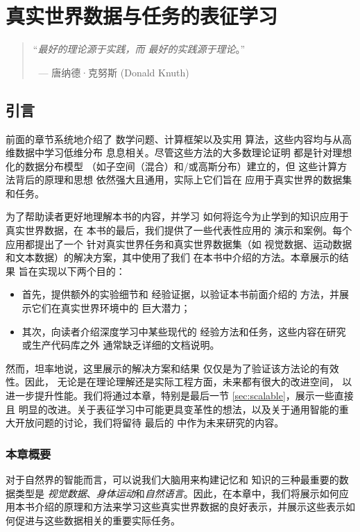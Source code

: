 \documentclass[../../book-main_zh.tex]{subfiles}
\begin{document}
\chapter{真实世界数据与任务的表征学习}
\label{ch:applications}

\begin{quote}
    \hfill    ``{\em 最好的理论源于实践，而
    最好的实践源于理论}。''

    $~$ \hfill --- 唐纳德·克努斯 (Donald Knuth)
\end{quote}
\vspace{5mm}

\section{引言}
前面的章节系统地介绍了
数学问题、计算框架以及实用
算法，这些内容均与从高维数据中学习低维分布
息息相关。尽管这些方法的大多数理论证明
都是针对理想化的数据分布模型
（如子空间（混合）和/或高斯分布）建立的，但
这些计算方法背后的原理和思想
依然强大且通用，实际上它们旨在
应用于真实世界的数据集和任务。

为了帮助读者更好地理解本书的内容，并学习
如何将迄今为止学到的知识应用于真实世界数据，在
本书的最后，我们提供了一些代表性应用的
演示和案例。每个应用都提出了一个
针对真实世界任务和真实世界数据集（如
视觉数据、运动数据和文本数据）的解决方案，其中使用了我们
在本书中介绍的方法。本章展示的结果
旨在实现以下两个目的：
\begin{itemize}
    \item 首先，提供额外的实验细节和
        经验证据，以验证本书前面介绍的
        方法，并展示它们在真实世界环境中的
        巨大潜力；
    \item 其次，向读者介绍深度学习中某些现代的
        经验方法和任务，这些内容在研究或生产代码库之外
        通常缺乏详细的文档说明。
\end{itemize}
然而，坦率地说，这里展示的解决方案和结果
仅仅是为了验证该方法论的有效性。因此，
无论是在理论理解还是实际工程方面，未来都有很大的改进空间，
以进一步提升性能。我们将通过本章，特别是最后一节 \ref{sec:scalable}，展示一些直接且
明显的改进。关于表征学习中可能更具变革性的想法，以及关于通用智能的重大开放问题的讨论，我们将留待
最后的  中作为未来研究的内容。

\subsection{本章概要}
\label{sec:application_outline}
对于自然界的智能而言，可以说我们大脑用来构建记忆和
知识的三种最重要的数据类型是
{\em 视觉数据}、{\em 身体运动}和{\em 自然语言}。因此，在本章中，我们将展示如何应用本书介绍的原理和方法来学习这些真实世界数据的良好表示，并展示这些表示如何促进与这些数据相关的重要实际任务。
\end{document}
